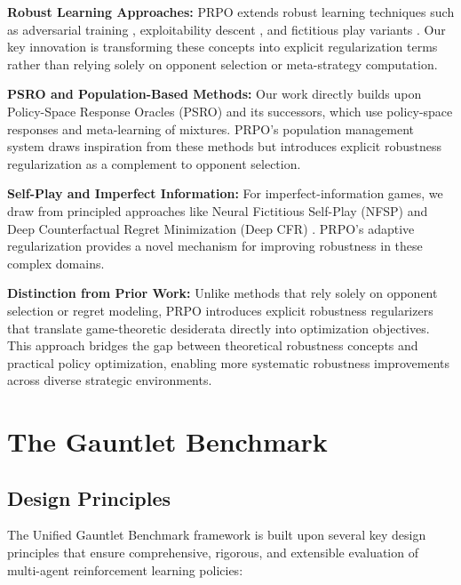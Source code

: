 \documentclass[sigconf,anonymous]{aamas}
\begin{document}
\textbf{Robust Learning Approaches:} PRPO extends robust learning techniques such as adversarial training \cite{Pinto2017RobustAR}, exploitability descent \cite{Lockhart2019ComputingNE}, and fictitious play variants \cite{Brown1951IterativeSO}. Our key innovation is transforming these concepts into explicit regularization terms rather than relying solely on opponent selection or meta-strategy computation.

\textbf{PSRO and Population-Based Methods:} Our work directly builds upon Policy-Space Response Oracles (PSRO) \cite{Lanctot2017PSRO} and its successors, which use policy-space responses and meta-learning of mixtures. PRPO's population management system draws inspiration from these methods but introduces explicit robustness regularization as a complement to opponent selection.

\textbf{Self-Play and Imperfect Information:} For imperfect-information games, we draw from principled approaches like Neural Fictitious Self-Play (NFSP) \cite{Heinrich2016DeepNF} and Deep Counterfactual Regret Minimization (Deep CFR) \cite{Brown2019DeepCF}. PRPO's adaptive regularization provides a novel mechanism for improving robustness in these complex domains.

\textbf{Distinction from Prior Work:} Unlike methods that rely solely on opponent selection or regret modeling, PRPO introduces explicit robustness regularizers that translate game-theoretic desiderata directly into optimization objectives. This approach bridges the gap between theoretical robustness concepts and practical policy optimization, enabling more systematic robustness improvements across diverse strategic environments.


\section{The Gauntlet Benchmark}
\label{sec:gauntlet}

\subsection{Design Principles}
The Unified Gauntlet Benchmark framework is built upon several key design principles that ensure comprehensive, rigorous, and extensible evaluation of multi-agent reinforcement learning policies:
\end{document}
